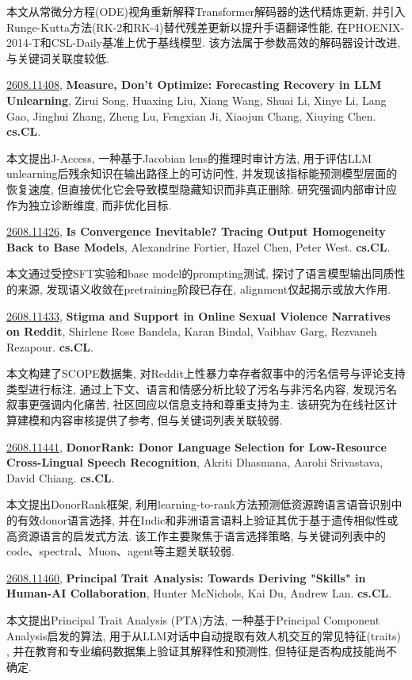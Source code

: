 \documentclass[9pt, a4paper]{article}
\theoremstyle{plain}
\theoremstyle{definition}
\theoremstyle{remark}
\newcommand{\arxivwithtarget}[3]{\hypertarget{#1}{}\href{https://arxiv.org/abs/#1}{#1}, \textbf{\textcolor{arxivblue}{#2}}, #3. }
\begin{document}
本文从常微分方程(ODE)视角重新解释Transformer解码器的迭代精炼更新, 并引入Runge-Kutta方法(RK-2和RK-4)替代残差更新以提升手语翻译性能, 在PHOENIX-2014-T和CSL-Daily基准上优于基线模型. 该方法属于参数高效的解码器设计改进, 与关键词关联度较低.


\arxivwithtarget{2608.11408}{Measure, Don't Optimize: Forecasting Recovery in LLM Unlearning}{Zirui Song, Huaxing Liu, Xiang Wang, Shuai Li, Xinye Li, Lang Gao, Jinghui Zhang, Zheng Lu, Fengxian Ji, Xiaojun Chang, Xiuying Chen}\textbf{cs.CL}.

本文提出J-Access, 一种基于Jacobian lens的推理时审计方法, 用于评估LLM unlearning后残余知识在输出路径上的可访问性, 并发现该指标能预测模型层面的恢复速度, 但直接优化它会导致模型隐藏知识而非真正删除. 研究强调内部审计应作为独立诊断维度, 而非优化目标.


\arxivwithtarget{2608.11426}{Is Convergence Inevitable? Tracing Output Homogeneity Back to Base Models}{Alexandrine Fortier, Hazel Chen, Peter West}\textbf{cs.CL}.

本文通过受控SFT实验和base model的prompting测试, 探讨了语言模型输出同质性的来源, 发现语义收敛在pretraining阶段已存在, alignment仅起揭示或放大作用.


\arxivwithtarget{2608.11433}{Stigma and Support in Online Sexual Violence Narratives on Reddit}{Shirlene Rose Bandela, Karan Bindal, Vaibhav Garg, Rezvaneh Rezapour}\textbf{cs.CL}.

本文构建了SCOPE数据集, 对Reddit上性暴力幸存者叙事中的污名信号与评论支持类型进行标注, 通过上下文、语言和情感分析比较了污名与非污名内容, 发现污名叙事更强调内化痛苦, 社区回应以信息支持和尊重支持为主. 该研究为在线社区计算建模和内容审核提供了参考, 但与关键词列表关联较弱.


\arxivwithtarget{2608.11441}{DonorRank: Donor Language Selection for Low-Resource Cross-Lingual Speech Recognition}{Akriti Dhasmana, Aarohi Srivastava, David Chiang}\textbf{cs.CL}.

本文提出DonorRank框架, 利用learning-to-rank方法预测低资源跨语言语音识别中的有效donor语言选择, 并在Indic和非洲语言语料上验证其优于基于遗传相似性或高资源语言的启发式方法. 该工作主要聚焦于语言选择策略, 与关键词列表中的code、spectral、Muon、agent等主题关联较弱.


\arxivwithtarget{2608.11460}{Principal Trait Analysis: Towards Deriving "Skills" in Human-AI Collaboration}{Hunter McNichols, Kai Du, Andrew Lan}\textbf{cs.CL}.

本文提出Principal Trait Analysis (PTA)方法, 一种基于Principal Component Analysis启发的算法, 用于从LLM对话中自动提取有效人机交互的常见特征(traits) , 并在教育和专业编码数据集上验证其解释性和预测性, 但特征是否构成技能尚不确定.
\end{document}
